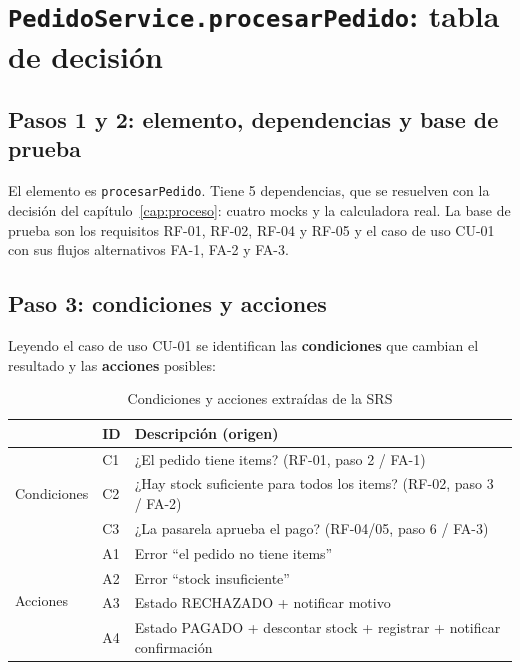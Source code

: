\documentclass[11pt,a4paper,oneside]{report}
\newcommand{\code}[1]{\texttt{#1}}
\begin{document}
\section{\code{PedidoService.procesarPedido}: tabla de decisión}

\subsection{Pasos 1 y 2: elemento, dependencias y base de prueba}
El elemento es \code{procesarPedido}. Tiene 5 dependencias, que se resuelven con la decisión del capítulo~\ref{cap:proceso}: cuatro mocks y la calculadora real. La base de prueba son los requisitos RF-01, RF-02, RF-04 y RF-05 y el caso de uso CU-01 con sus flujos alternativos FA-1, FA-2 y FA-3.

\subsection{Paso 3: condiciones y acciones}
Leyendo el caso de uso CU-01 se identifican las \textbf{condiciones} que cambian el resultado y las \textbf{acciones} posibles:
\begin{table}[H]
\centering
\caption{Condiciones y acciones extraídas de la SRS}
\small
\begin{tabularx}{\linewidth}{llX}
\toprule
& \textbf{ID} & \textbf{Descripción (origen)}\\
\midrule
\multirow{3}{*}{Condiciones} & C1 & ¿El pedido tiene items? (RF-01, paso 2 / FA-1)\\
& C2 & ¿Hay stock suficiente para todos los items? (RF-02, paso 3 / FA-2)\\
& C3 & ¿La pasarela aprueba el pago? (RF-04/05, paso 6 / FA-3)\\
\midrule
\multirow{4}{*}{Acciones} & A1 & Error ``el pedido no tiene items''\\
& A2 & Error ``stock insuficiente''\\
& A3 & Estado RECHAZADO + notificar motivo\\
& A4 & Estado PAGADO + descontar stock + registrar + notificar confirmación\\
\bottomrule
\end{tabularx}
\end{table}
\end{document}
